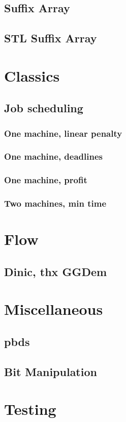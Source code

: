 \subsection{Suffix Array}
\subsection{STL Suffix Array}
\section{Classics}
\subsection{Job scheduling}
\subsubsection{One machine, linear penalty}
\subsubsection{One machine, deadlines}
\subsubsection{One machine, profit}
\subsubsection{Two machines, min time}

\section{Flow}
\subsection{Dinic, thx GGDem}

\section{Miscellaneous}
\subsection{pbds}
\subsection{Bit Manipulation}

\section{Testing}
